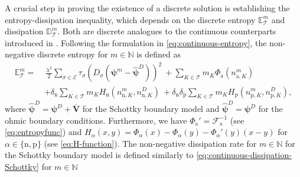 \documentclass[10pt,a4paper, final]{article}
\def\electrons{\text{n}}
\def\holes{\text{p}}
\def\ions{\text{a}}
\theoremstyle{definition}								%
\numberwithin{equation}{section}
\numberwithin{figure}{section}
\numberwithin{theorem}{section}
\begin{document}
A crucial step in proving the existence of a discrete solution is establishing the entropy-dissipation inequality, which depends on the discrete entropy $\mathbb{E}_\mathcal{T}^m$ and dissipation $\mathbb{D}_{\mathcal{T}}^m$.
Both are discrete analogues to the continuous counterparts introduced in .
Following the formulation in \eqref{eq:continuous-entropy}, the non-negative discrete entropy for $m \in \mathbb{N}$ is defined as
\begin{equation} \label{eq:discrete-entropy-memristor}
    \begin{split}
        \mathbb{E}_\mathcal{T}^m
        = \, &\,\frac{\lambda^2}{2} \sum_{\sigma \in \mathcal{E}} \tau_\sigma \left(D_{\sigma} ( \boldsymbol{\psi}^m - \boldsymbol{\hat{\psi}}^D)\right)^2
        ~
        + \sum_{K \in \mathcal{T}} m_K \Phi_{\ions}(n_{\ions, K}^m)\\
        ~
        &+  \delta_\electrons \sum_{K \in \mathcal{T}} m_K H_\electrons(n_{\electrons, K}^m, n_{\electrons, K}^D)
        ~
        +  \delta_\electrons \delta_\holes \sum_{K \in \mathcal{T}} m_K H_\holes(n_{\holes, K}^m, n_{\holes, K}^D),
    \end{split}
\end{equation}
where $\boldsymbol{\hat{\psi}}^D = \boldsymbol{\psi}^D + \overline{\mathbf{V}}$ for the Schottky boundary model and $\boldsymbol{\hat{\psi}}^D = \boldsymbol{\psi}^D$ for the ohmic boundary conditions.
Furthermore, we have $\Phi_{\ions}' = \mathcal{F}_\ions^{-1} $ (see \eqref{eq:entropyfunc}) and $ H_\alpha(x,y) = \Phi_\alpha(x) - \Phi_\alpha(y) - \Phi_\alpha'(y)(x-y)$ for $\alpha \in \{ \electrons, \holes\}$ (see \eqref{eq:H-function}).
The non-negative dissipation rate for $m \in \mathbb{N}$ for the Schottky boundary model is defined similarly to \eqref{eq:continuous-dissipation-Schottky} for $m \in \mathbb{N}$
\end{document}
